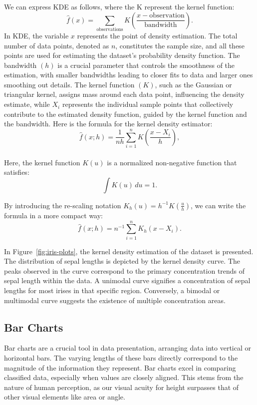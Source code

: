 \documentclass{article}\usepackage[]{graphicx}\usepackage[]{xcolor}
\numberwithin{equation}{section}
\begin{document}
\noindent
We can express KDE as follows, where the K represent the kernel function:
$$\hat{f}(x) = \sum_{\text{observations}} K\left(\frac{x - \text{observation}}{\text{bandwidth}}\right).$$
In KDE, the variable $x$ represents the point of density estimation. The total number of data points, denoted as $n$, constitutes the sample size, and all these points are used for estimating the dataset's probability density function. The bandwidth $(h)$ is a crucial parameter that controls the smoothness of the estimation, with smaller bandwidths leading to closer fits to data and larger ones smoothing out details. The kernel function $(K)$, such as the Gaussian or triangular kernel, assigns mass around each data point, influencing the density estimate, while $X_i$ represents the individual sample points that collectively contribute to the estimated density function, guided by the kernel function and the bandwidth\cite{wand1994kernel}. Here is the formula for the kernel density estimator:
$$\hat{f}(x; h) = \frac{1}{nh} \sum_{i=1}^{n} K\left(\frac{x - X_i}{h}\right),$$\\
Here, the kernel function \( K(u) \) is a normalized non-negative function that satisfies:
$$ \int K(u) \, du = 1. $$

\noindent
By introducing the re-scaling notation $K_h(u) = h^{-1}K(\frac{u}{h})$, we can write the formula in a more compact way:
$$\hat{f}(x; h) = n^{-1} \sum_{i=1}^{n} K_h(x - X_i).$$

\noindent In Figure~\ref{fig:iris-plots}, the kernel density estimation of the dataset is presented. The distribution of sepal lengths is depicted by the kernel density curve. The peaks observed in the curve correspond to the primary concentration trends of sepal length within the data. A unimodal curve signifies a concentration of sepal lengths for most irises in that specific region. Conversely, a bimodal or multimodal curve suggests the existence of multiple concentration areas.

\subsection{Bar Charts}
\noindent Bar charts are a crucial tool in data presentation, arranging data into vertical or horizontal bars. The varying lengths of these bars directly correspond to the magnitude of the information they represent. Bar charts excel in comparing classified data, especially when values are closely aligned. This stems from the nature of human perception, as our visual acuity for height surpasses that of other visual elements like area or angle.\\
\end{document}
